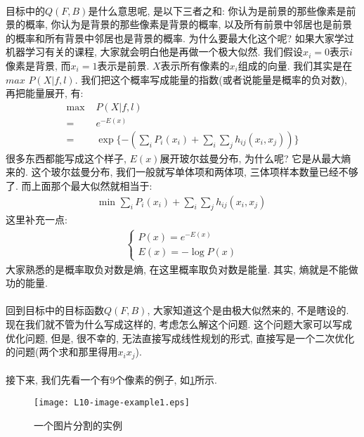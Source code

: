            \paragraph{}目标中的$Q(F, B)$是什么意思呢, 是以下三者之和: 你认为是前景的那些像素是前景的概率, 你认为是背景的那些像素是背景的概率, 以及所有前景中邻居也是前景的概率和所有背景中邻居也是背景的概率. 为什么要最大化这个呢? 如果大家学过机器学习有关的课程, 大家就会明白他是再做一个极大似然. 我们假设$x_i=0$表示$i$像素是背景, 而$x_i=1$表示是前景. $X$表示所有像素的$x_i$组成的向量. 我们其实是在$max$  $P(X|f,l)$. 我们把这个概率写成能量的指数(或者说能量是概率的负对数), 再把能量展开, 有:
            \begin{align*}
           \text{max  } & P(X|f, l) \\
            =& e^{-E(x)}  \\
            =& \exp{\{-(\sum_i {P_i(x_i)} + \sum_i \sum_j h_{ij}(x_i, x_j))\}}
            \end{align*}
            很多东西都能写成这个样子, $E(x)$展开玻尔兹曼分布, 为什么呢? 它是从最大熵来的. 这个玻尔兹曼分布, 我们一般就写单体项和两体项, 三体项样本数量已经不够了. 而上面那个最大似然就相当于:
            \begin{align*}
            \text{min  } \sum_i {P_i(x_i)} + \sum_i \sum_j h_{ij}(x_i, x_j)
            \end{align*}
            这里补充一点:
            \begin{align*}
            \begin{cases}
            P(x) = e^{-E(x)} \\
            E(x) = -\log{P(x)}
            \end{cases}
            \end{align*}
            大家熟悉的是概率取负对数是熵, 在这里概率取负对数是能量. 其实, 熵就是不能做功的能量.
            \paragraph{}回到目标中的目标函数$Q(F, B)$, 大家知道这个是由极大似然来的, 不是瞎设的. 现在我们就不管为什么写成这样的, 考虑怎么解这个问题. 这个问题大家可以写成优化问题, 但是, 很不幸的, 无法直接写成线性规划的形式, 直接写是一个二次优化的问题(两个求和那里得用$x_i x_j$). 
             
            \paragraph{}接下来, 我们先看一个有$9$个像素的例子, 如\figurename\ref{Figure: image_segmentation_example}所示. 
            \begin{figure}[h]
                \centering
                \texttt{[image: L10-image-example1.eps]}
                \caption{一个图片分割的实例}
                \label{Figure: image_segmentation_example}
            \end{figure}
